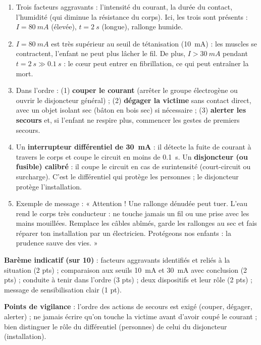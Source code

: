 \documentclass[11pt]{article}
\begin{document}
\begin{corrige}
\begin{enumerate}
\item Trois facteurs aggravants : l'intensité du courant, la durée du contact, l'humidité (qui diminue la résistance du corps). Ici, les trois sont présents : $I = \SI{80}{mA}$ (élevée), $t = \SI{2}{s}$ (longue), rallonge humide.
\item $I = \SI{80}{mA}$ est très supérieur au seuil de tétanisation (\SI{10}{mA}) : les muscles se contractent, l'enfant ne peut plus lâcher le fil. De plus, $I > \SI{30}{mA}$ pendant $t = \SI{2}{s} \gg \SI{0,1}{s}$ : le cœur peut entrer en fibrillation, ce qui peut entraîner la mort.
\item Dans l'ordre : (1) \textbf{couper le courant} (arrêter le groupe électrogène ou ouvrir le disjoncteur général) ; (2) \textbf{dégager la victime} sans contact direct, avec un objet isolant sec (bâton en bois sec) si nécessaire ; (3) \textbf{alerter les secours} et, si l'enfant ne respire plus, commencer les gestes de premiers secours.
\item Un \textbf{interrupteur différentiel de \SI{30}{mA}} : il détecte la fuite de courant à travers le corps et coupe le circuit en moins de \SI{0,1}{s}. Un \textbf{disjoncteur (ou fusible) calibré} : il coupe le circuit en cas de surintensité (court-circuit ou surcharge). C'est le différentiel qui protège les personnes ; le disjoncteur protège l'installation.
\item Exemple de message : « Attention ! Une rallonge dénudée peut tuer. L'eau rend le corps très conducteur : ne touche jamais un fil ou une prise avec les mains mouillées. Remplace les câbles abîmés, garde les rallonges au sec et fais réparer ton installation par un électricien. Protégeons nos enfants : la prudence sauve des vies. »
\end{enumerate}
\textbf{Barème indicatif (sur 10)} : facteurs aggravants identifiés et reliés à la situation (2 pts) ; comparaison aux seuils \SI{10}{mA} et \SI{30}{mA} avec conclusion (2 pts) ; conduite à tenir dans l'ordre (3 pts) ; deux dispositifs et leur rôle (2 pts) ; message de sensibilisation clair (1 pt).\par
\textbf{Points de vigilance} : l'ordre des actions de secours est exigé (couper, dégager, alerter) ; ne jamais écrire qu'on touche la victime avant d'avoir coupé le courant ; bien distinguer le rôle du différentiel (personnes) de celui du disjoncteur (installation).
\end{corrige}
\end{document}
